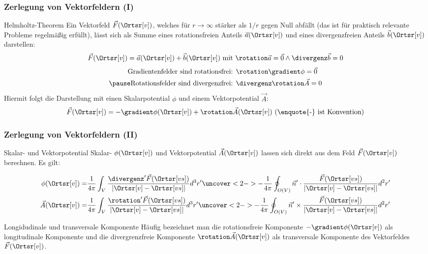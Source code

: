 \begin{frame}
  \frametitle{Zerlegung von Vektorfeldern (I)}
  \begin{block}{Helmholtz-Theorem}
    Ein Vektorfeld $\vec{F}(\Ortsr[v])$, welches für $r\to\infty$
    stärker als $1/r$ gegen Null abfällt (das ist für praktisch
    relevante Probleme regelmäßig erfüllt), lässt sich als Summe eines
    rotationsfreien Anteils $\vec{a}(\Ortsr[v])$ und eines
    divergenzfreien Anteils $\vec{b}(\Ortsr[v])$ darstellen:
    $$
    \vec{F}(\Ortsr[v]) = \vec{a}(\Ortsr[v]) + \vec{b}(\Ortsr[v]) \text{ mit
    } \rotation  \vec{a} = \vec{0} \land \divergenz  \vec{b} = 0 
    $$\pause
    \begin{align*}
    \text{Gradientenfelder sind rotationsfrei: } & \rotation\gradient \phi =\vec{0}\\ \pause
      \text{Rotationsfelder sind divergenzfrei: } & \divergenz\rotation \vec{A}
                                                    = 0
    \end{align*}\pause
    Hiermit folgt die Darstellung mit einen \alert{Skalarpotential}
    $\phi$ und einem \alert{Vektorpotential} $\vec{A}$:
    $$
    \vec{F}(\Ortsr[v]) = - \gradient \phi (\Ortsr[v]) + \rotation
    \vec{A}(\Ortsr[v]) \text{ (\enquote{-} ist Konvention)}
    $$
  \end{block}
  \end{frame}
\begin{frame}
  \frametitle{Zerlegung von Vektorfeldern (II)}
  \begin{block}{Skalar- und Vektorpotential}
    \alert{Skalar-} $\phi (\Ortsr[v])$ und \alert{Vektorpotential}
    $\vec{A}(\Ortsr[v])$ lassen sich direkt aus dem Feld
    $\vec{F}(\Ortsr[v])$ berechnen. Es gilt:

    \begin{align*}
  \phi (\Ortsr[v]) = & \frac{1}{4\pi} \int_V \frac{\divergenz'
                     \vec{F}(\Ortsr[vs])}{\left|\Ortsr[v]-\Ortsr[vs]\right|}
                     d^3r'  \uncover<2->{- \frac{1}{4\pi} \oint_{O(V)}
                     \vec{n}' \cdot \frac{\vec{F}(\Ortsr[vs])}{\left|\Ortsr[v]-\Ortsr[vs]\right|}
                     d^2r'}\\
  \vec{A} (\Ortsr[v]) = & \frac{1}{4\pi} \int_V \frac{\rotation'
                     \vec{F}(\Ortsr[vs])}{\left|\Ortsr[v]-\Ortsr[vs]\right|}
                     d^3r'  \uncover<2->{- \frac{1}{4\pi} \oint_{O(V)}
                     \vec{n}' \times \frac{\vec{F}(\Ortsr[vs])}{\left|\Ortsr[v]-\Ortsr[vs]\right|}
                     d^2r'}
    \end{align*}\pause
  \end{block}\pause

  \begin{block}{Longidudinale und transversale Komponente}
    Häufig bezeichnet man die rotationsfreie Komponente $ - \gradient
    \phi (\Ortsr[v])$ als \alert{longitudinale Komponente} und die
    divergrenzfreie Komponente $\rotation
    \vec{A}(\Ortsr[v])$ als \alert{transversale Komponente} des
    Vektorfeldes $\vec{F}(\Ortsr[v])$.
    \end{block}
  \end{frame}


